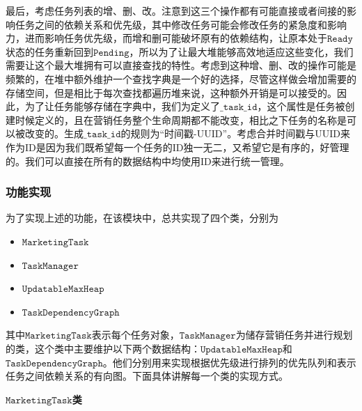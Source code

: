 \documentclass[cn,hazy,blue,10pt,normal]{elegantnote}
\begin{document}
最后，考虑任务列表的增、删、改。注意到这三个操作都有可能直接或者间接的影响任务之间的依赖关系和优先级，其中修改任务可能会修改任务的紧急度和影响力，进而影响任务优先级，而增和删可能破坏原有的依赖结构，让原本处于$\mathtt{Ready}$状态的任务重新回到$\mathtt{Pending}$，所以为了让最大堆能够高效地适应这些变化，我们需要让这个最大堆拥有可以直接查找的特性。考虑到这种增、删、改的操作可能是频繁的，在堆中额外维护一个查找字典是一个好的选择，尽管这样做会增加需要的存储空间，但是相比于每次查找都遍历堆来说，这种额外开销是可以接受的。因此，为了让任务能够存储在字典中，我们为定义了$\mathtt{\_task\_id}$，这个属性是任务被创建时候定义的，且在营销任务整个生命周期都不能改变，相比之下任务的名称是可以被改变的。生成$\mathtt{\_task\_id}$的规则为“时间戳-UUID”。考虑合并时间戳与UUID来作为ID是因为我们既希望每一个任务的ID独一无二，又希望它是有序的，好管理的。我们可以直接在所有的数据结构中均使用ID来进行统一管理。

\subsubsection{功能实现}
为了实现上述的功能，在该模块中，总共实现了四个类，分别为
\begin{itemize}
    \item $\mathtt{MarketingTask}$
    \item $\mathtt{TaskManager}$
    \item $\mathtt{UpdatableMaxHeap}$
    \item $\mathtt{TaskDependencyGraph}$
\end{itemize}
其中$\mathtt{MarketingTask}$表示每个任务对象，$\mathtt{TaskManager}$为储存营销任务并进行规划的类，这个类中主要维护以下两个数据结构：$\mathtt{UpdatableMaxHeap}$和$\mathtt{TaskDependencyGraph}$。他们分别用来实现根据优先级进行排列的优先队列和表示任务之间依赖关系的有向图。下面具体讲解每一个类的实现方式。

\textbf{$\mathtt{MarketingTask}$类}
\end{document}
